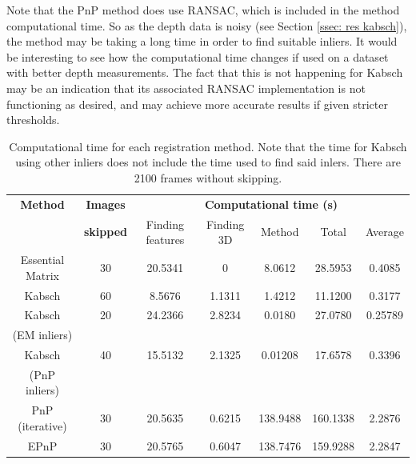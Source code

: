 \documentclass[12pt,a4paper]{article}
\begin{document}
    Note that the PnP method does use RANSAC, which is included in the method computational time. So as the depth data is noisy (see Section \ref{ssec: res kabsch}), the method may be taking a long time in order to find suitable inliers. It would be interesting to see how the computational time changes if used on a dataset with better depth measurements. The fact that this is not happening for Kabsch may be an indication that its associated RANSAC implementation is not functioning as desired, and may achieve more accurate results if given stricter thresholds.

    \begin{table}[t!]
      \centering{}
      \hspace*{-1.5cm}\begin{tabular}{|c|c|c|c|c|c|c|}
      \hline
      \textbf{Method} &\textbf{Images}  & \multicolumn{5}{c|}{\textbf{Computational time (s)}} \\ \cline{3-7}
      {} & \textbf{skipped} & Finding features & Finding 3D & Method & Total & Average \\
      \hline
      Essential Matrix       & 30 & 20.5341  & 0          & 8.0612   & 28.5953  & 0.4085 \\
      \hline
      Kabsch                 & 60 & 8.5676   & 1.1311 & 1.4212   & 11.1200  & 0.3177 \\
      \hline
      Kabsch                 & 20 & 24.2366  & 2.8234  & 0.0180  & 27.0780 & 0.25789 \\
      (EM inliers)       & {} & {} & {} & {} & {} & {} \\
      \hline
      Kabsch                 & 40 & 15.5132   & 2.1325 & 0.01208 & 17.6578  & 0.3396 \\
      (PnP inliers)          & {} & {} & {} & {} & {} & {} \\
      \hline
      PnP (iterative)        & 30 & 20.5635  & 0.6215 & 138.9488 & 160.1338 & 2.2876 \\
      \hline
      EPnP                   & 30 & 20.5765  & 0.6047 & 138.7476 & 159.9288 & 2.2847 \\
      \hline
      \end{tabular}\hspace*{-1.5cm}
      \caption{Computational time for each registration method. Note that the time for Kabsch using other inliers does not include the time used to find said inlers. There are 2100 frames without skipping.}
      \label{t: res quad3 time}
    \end{table}  
\end{document}
